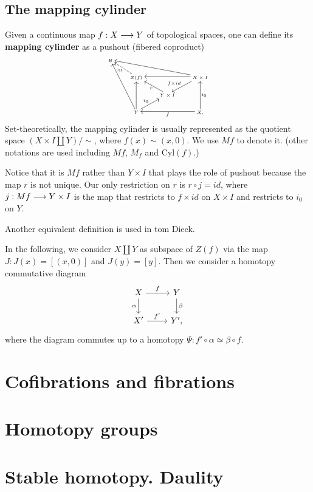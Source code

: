 \documentclass[11pt]{book} %
\begin{document}
\section{The mapping cylinder}
\begin{definition}
Given a continuous map $f:X\longrightarrow Y$ of topological spaces, one can define its \textbf{mapping cylinder} as a pushout (fibered coproduct) 
\[
\tiny
\begin{tikzcd}
B &  &  &  \\
 & Z(f) \arrow[lu, "\exists!", dashed] &  & X\times I \arrow[ll] \arrow[ld, "f\times id"'] \arrow[lllu] \\
 &  & Y\times I \arrow[lu, "r"] &  \\
 & Y \arrow[uu] \arrow[ru, "i_0"] \arrow[luuu] &  & X \arrow[ll, "f"] \arrow[uu, "i_0"'],
\end{tikzcd}
\]
Set-theoretically, the mapping cylinder is usually represented as the quotient space $(X\times I \coprod Y)/\sim$, where $f(x)\sim (x,0)$.
We use $Mf$ to denote it. (other notations are used including $Mf$, $M_f$ and $\text{Cyl}(f)$.)
\end{definition}
Notice that it is $Mf$ rather than $Y\times I$ that plays the role of pushout because the map $r$ is not unique. Our only restriction on $r$ is $r\circ j=id$, where $j: Mf\longrightarrow Y\times I$ is the map that restricts to $f\times id$ on $X\times I$ and restricts to $i_0$ on $Y$.
\begin{remark}
Another equivalent definition is used in tom Dieck.
\end{remark}

In the following, we consider $X\coprod Y$ as subspace of $Z(f)$ via the map $J:J(x)=[(x,0)]$ and $J(y)=[y]$. Then we consider a homotopy commutative diagram
\[
\begin{tikzcd}
X \arrow[r, "f"] \arrow[d, "\alpha"'] & Y \arrow[d, "\beta"] \\
X' \arrow[r, "f'"] & Y',
\end{tikzcd}
\]
where the diagram commutes up to a homotopy $\Psi: f'\circ \alpha\simeq \beta \circ f$. 
\chapter{Cofibrations and fibrations}
\chapter{Homotopy groups}
\chapter{Stable homotopy. Daulity}
\end{document}
